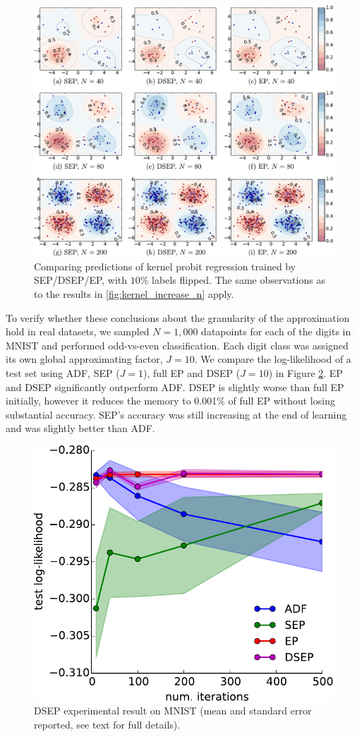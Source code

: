 \begin{figure}
\centering
\includegraphics[width=1\linewidth]{Chapter3/sep/fig/flip_kernel}
\caption{Comparing predictions of kernel probit regression trained by SEP/DSEP/EP, with $10\%$ labels flipped. The same observations as to the results in \ref{fig:kernel_increase_n} apply.}
\label{fig:kernel_flip}
\end{figure}

To verify whether these conclusions about the granularity of the approximation hold in real datasets, we sampled $N=1,000$ datapoints for each of the digits in MNIST and performed odd-vs-even classification. Each digit class was assigned its own global approximating factor, $J=10$. We compare the log-likelihood of a test set using ADF, SEP ($J=1$), full EP and DSEP ($J=10$) in Figure \ref{fig:mnist}. EP and DSEP significantly outperform ADF. DSEP is slightly worse than full EP initially, however it reduces the memory to 0.001\% of full EP without losing substantial accuracy. SEP's accuracy was still increasing at the end of learning and was slightly better than ADF.

\begin{figure}
\centering
\includegraphics[width=0.4\linewidth]{Chapter3/sep/fig/mnist_error}
\caption{DSEP experimental result on MNIST (mean and standard error reported, see text for full details).}
\label{fig:mnist}
\end{figure} 
 
